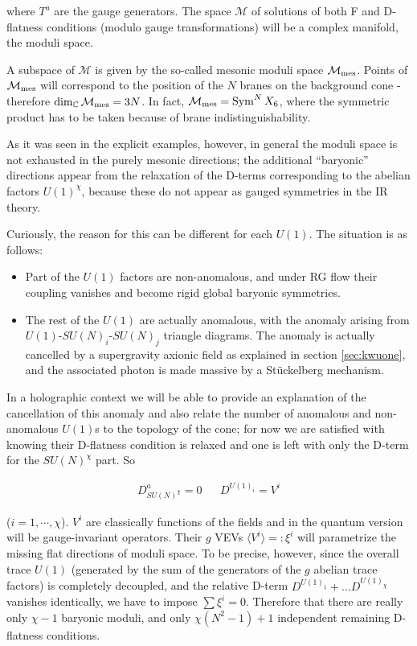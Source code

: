 where $T^a$ are the gauge generators. The space $\mathcal{M}$ of solutions of both F and D-flatness conditions (modulo gauge transformations) will be a complex manifold, the moduli space.

A subspace of $\mathcal{M}$ is given by the so-called mesonic moduli space $\mathcal{M}_\mathrm{mes}$. Points of $\mathcal{M}_\mathrm{mes}$ will correspond to the position of the $N$ branes on the background cone - therefore $\dim_\mathbb{C} \mathcal{M}_\mathrm{mes} = 3N$. In fact, $\mathcal{M}_\mathrm{mes} = \operatorname{Sym}^N X_6$, where the symmetric product has to be taken because of brane indistinguishability.

As it was seen in the explicit examples, however, in general the moduli space is not exhausted in the purely mesonic directions; the additional ``baryonic'' directions appear from the relaxation of the D-terms corresponding to the abelian factors $U(1)^\chi$, because these do not appear as gauged symmetries in the IR theory.

Curiously, the reason for this can be different for each $U(1)$. The situation is as follows:

\begin{itemize}
	\item Part of the $U(1)$ factors are non-anomalous, and under RG flow their coupling vanishes and become rigid global baryonic symmetries.
	\item The rest of the $U(1)$ are actually anomalous, with the anomaly arising from $U(1)$-$SU(N)_i$-$SU(N)_j$ triangle diagrams. The anomaly is actually cancelled by a supergravity axionic field as explained in section \ref{sec:kwuone}, and the associated photon is made massive by a St\"uckelberg mechanism\cite{Martelli:sbv}.
\end{itemize}

In a holographic context we will be able to provide an explanation of the cancellation of this anomaly and also relate the number of anomalous and non-anomalous $U(1)$s to the topology of the cone; for now we are satisfied with knowing their D-flatness condition is relaxed and one is left with only the D-term for the $SU(N)^\chi$ part. So

\begin{align}
	D^a_{SU(N)^\chi} = 0 && D^{U(1)_i} = V^i
	\label{}
\end{align}

($i=1,\cdots,\chi$). $V^i$ are classically functions of the fields and in the quantum version will be gauge-invariant operators. Their $g$ VEVs $\langle V^i \rangle =: \xi^i$ will parametrize the missing flat directions of moduli space. To be precise, however, since the overall trace $U(1)$ (generated by the sum of the generators of the $g$ abelian trace factors) is completely decoupled, and the relative D-term $D^{U(1)_1} + \ldots D^{U(1)_\chi}$ vanishes identically, we have to impose $\sum \xi^i = 0$. Therefore that there are really only $\chi-1$ baryonic moduli, and only $\chi(N^2-1)+1$ independent remaining D-flatness conditions.

